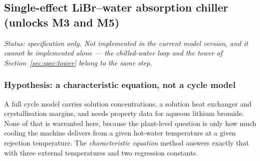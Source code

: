 \subsection{Single-effect LiBr--water absorption chiller (unlocks M3 and M5)}
\label{sec:spec:abs}

\emph{Status: specification only. Not implemented in the current model version, and it cannot be
implemented alone --- the chilled-water loop and the tower of Section~\ref{sec:spec:tower} belong to
the same step.}

\subsubsection{Hypothesis: a characteristic equation, not a cycle model}
A full cycle model carries solution concentrations, a solution heat exchanger and crystallisation
margins, and needs property data for aqueous lithium bromide. None of that is warranted here, because
the plant-level question is only how much cooling the machine delivers from a given hot-water
temperature at a given rejection temperature. The \emph{characteristic equation} method answers
exactly that with three external temperatures and two regression constants.

